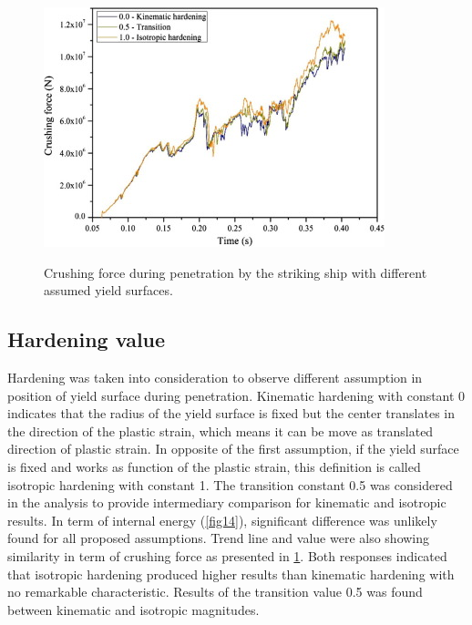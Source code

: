 \documentclass[../Final.tex]{subfiles}
\begin{document}
\begin{figure}[h]
    \centering
    \includegraphics[width=\columnwidth]{fig15.jpg}
    \label{fig15}
    \caption{Crushing force during penetration by the striking ship with different assumed yield surfaces.}
\end{figure}

\subsection{Hardening value}

Hardening was taken into consideration to observe different assumption in position of yield surface during penetration. 
Kinematic hardening with constant 0 indicates that the radius of the yield surface is fixed but the center translates in the direction of the plastic strain, which means it can be move as translated direction of plastic strain. 
In opposite of the first assumption, if the yield surface is fixed and works as function of the plastic strain, this definition is called isotropic hardening with constant 1. 
The transition constant 0.5 was considered in the analysis to provide intermediary comparison for kinematic and isotropic results. 
In term of internal energy (\ref{fig14}), significant difference was unlikely found for all proposed assumptions. Trend line and value were also showing similarity in term of crushing force as presented in \ref{fig15}. 
Both responses indicated that isotropic hardening produced higher results than kinematic hardening with no remarkable characteristic. Results of the transition value 0.5 was found between kinematic and isotropic magnitudes. 
\end{document}
